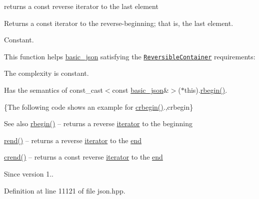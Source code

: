 returns a const reverse iterator to the last element 

Returns a const iterator to the reverse-\/beginning; that is, the last element.

  Constant.

This function helps {\ttfamily \hyperlink{classnlohmann_1_1basic__json}{basic\+\_\+json}} satisfying the \href{http://en.cppreference.com/w/cpp/concept/ReversibleContainer}{\tt Reversible\+Container} requirements\+:
\begin{DoxyItemize}
\item The complexity is constant.
\item Has the semantics of {\ttfamily const\+\_\+cast$<$const \hyperlink{classnlohmann_1_1basic__json}{basic\+\_\+json}\&$>$($\ast$this).\hyperlink{classnlohmann_1_1basic__json_a1ef93e2006dbe52667294f5ef38b0b10}{rbegin()}}.
\end{DoxyItemize}

\{The following code shows an example for {\ttfamily \hyperlink{classnlohmann_1_1basic__json_a1e0769d22d54573f294da0e5c6abc9de}{crbegin()}}.,crbegin\}

\begin{DoxySeeAlso}{See also}
\hyperlink{classnlohmann_1_1basic__json_a1ef93e2006dbe52667294f5ef38b0b10}{rbegin()} -- returns a reverse \hyperlink{classnlohmann_1_1basic__json_a099316232c76c034030a38faa6e34dca}{iterator} to the beginning 

\hyperlink{classnlohmann_1_1basic__json_ac77aed0925d447744676725ab0b6d535}{rend()} -- returns a reverse \hyperlink{classnlohmann_1_1basic__json_a099316232c76c034030a38faa6e34dca}{iterator} to the \hyperlink{classnlohmann_1_1basic__json_a13e032a02a7fd8a93fdddc2fcbc4763c}{end} 

\hyperlink{classnlohmann_1_1basic__json_a5795b029dbf28e0cb2c7a439ec5d0a88}{crend()} -- returns a const reverse \hyperlink{classnlohmann_1_1basic__json_a099316232c76c034030a38faa6e34dca}{iterator} to the \hyperlink{classnlohmann_1_1basic__json_a13e032a02a7fd8a93fdddc2fcbc4763c}{end}
\end{DoxySeeAlso}
\begin{DoxySince}{Since}
version 1.. 
\end{DoxySince}


Definition at line 11121 of file json.\+hpp.

